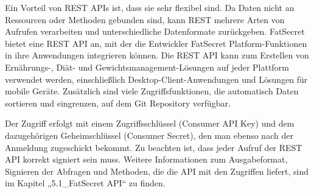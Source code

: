 Ein Vorteil von REST APIs ist, dass sie sehr flexibel sind. Da Daten nicht an Ressourcen oder Methoden gebunden sind, kann REST mehrere Arten von Aufrufen verarbeiten und unterschiedliche Datenformate zurückgeben. 
FatSecret bietet eine REST API an, mit der die Entwickler FatSecret Platform-Funktionen in ihre Anwendungen integrieren können. Die REST API kann zum Erstellen von Ernährungs-, Diät- und Gewichtsmanagement-Lösungen auf jeder Plattform verwendet werden, einschließlich Desktop-Client-Anwendungen und Lösungen für mobile Geräte. Zusätzlich sind viele Zugriffsfunktionen, die automatisch Daten sortieren und eingrenzen, auf dem Git Repository verfügbar. 

Der Zugriff erfolgt mit einem Zugriffsschlüssel (Consumer API Key)  und dem dazugehörigen Geheimschlüssel (Consumer Secret), den man ebenso nach der Anmeldung zugeschickt bekommt. Zu beachten ist, dass jeder Aufruf der REST API korrekt signiert sein muss. Weitere Informationen zum Ausgabeformat, Signieren der Abfragen und Methoden, die die API mit den Zugriffen liefert, sind im Kapitel „5.1\_FatSecret API“ zu finden.

